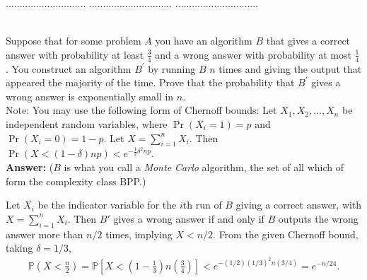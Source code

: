 \documentclass{article}
\begin{document}
\pagebreak
{} $.............................$
 $..............................$
          $..............................$\\

\bigskip

\\
Suppose that for some problem $A$ you have an algorithm $B$ that gives a correct answer with probability at least $\frac{3}{4}$
and a wrong answer with probability at most $\frac{1}{4}$. 
You construct an algorithm $B^\prime$ by running $B$ $n$ times and giving the output that appeared the majority 
of the time. Prove that the probability that $B^\prime$ gives a wrong answer 
is exponentially small in $n$. \\
Note: You may use the following form of Chernoff bounds: 
Let $X_1, X_2, \ldots , X_n$ be independent random variables, where $\Pr (X_i = 1) = p$ and 
$\Pr (X_i = 0) = 1-p$. Let $X=\sum_{i=1}^n X_i$. Then $\Pr (X< (1-\delta )np )< e^{-\frac{1}{2}\delta^2 n p}$.\\

\noindent
{\bf Answer:} ($B$ is what you call a \emph{Monte Carlo} algorithm, the set of all which of form the complexity class BPP.) \par
Let $X_i$ be the indicator variable for the $i$th run of $B$ giving a correct answer, with $X = \sum_{i = 1}^n X_i$. Then $B'$ gives a wrong answer if and only if $B$ outputs the wrong answer more than $n/2$ times, implying $X < n/2$. From the given Chernoff bound, taking $\delta = 1/3$,
\begin{align*}
    \mathbb{P}\left( X < \frac{n}{2} \right) = \mathbb{P} \left[ X < \left( 1 - \frac{1}{3} \right) n \left( \frac{3}{4} \right) \right] < e^{-(1/2) (1/3)^2 n (3/4)} = e^{-n/24}.
\end{align*}
\end{document}
